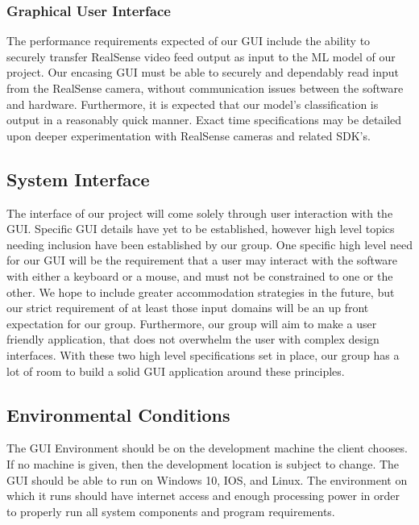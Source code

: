 \documentclass[onecolumn, draftclsnofoot,10pt, compsoc]{IEEEtran}
\begin{document}
\subsubsection{Graphical User Interface}
The performance requirements expected of our GUI include the ability to securely transfer RealSense video feed output as input to the ML model of our project. Our encasing GUI must be able to securely and dependably read input from the RealSense camera, without communication issues between the software and hardware. Furthermore, it is expected that our model's classification is output in a reasonably quick manner. Exact time specifications may be detailed upon deeper experimentation with RealSense cameras and related SDK’s.
\subsection{System Interface}
The interface of our project will come solely through user interaction with the GUI. Specific GUI details have yet to be established, however high level topics needing inclusion have been established by our group. One specific high level need for our GUI will be the requirement that a user may interact with the software with either a keyboard or a mouse, and must not be constrained to one or the other. We hope to include greater accommodation strategies in the future, but our strict requirement of at least those input domains will be an up front expectation for our group. Furthermore, our group will aim to make a user friendly application, that does not overwhelm the user with complex design interfaces. With these two high level specifications set in place, our group has a lot of room to build a solid GUI application around these principles.

\subsection{Environmental Conditions}
The GUI Environment should be on the development machine the client chooses. If no machine is given, then the development location is subject to change. The GUI should be able to run on Windows 10, IOS, and Linux. The environment on which it runs should have internet access and enough processing power in order to properly run all system components and program requirements. 
\end{document}
